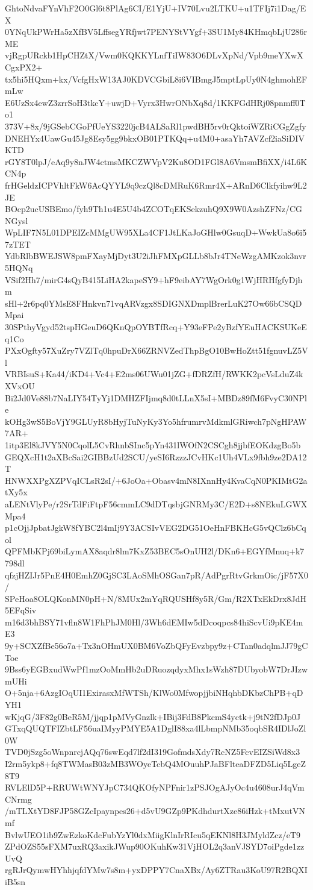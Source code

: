 GhtoNdvaFYnVhF2O0Gl6t8PlAg6CI/E1YjU+IV70Lvu2LTKU+u1TFIj7i1Dag/EX
0YNqUkPWrHa5zXfBV5LffsegYRfjwt7PENYStVYgf+3SU1My84KHmqbLjU286rME
vjRgpURckb1HpCHZtX/Vwm0KQKKYLnfTiIW83O6DLvXpNd/Vpb9meYXwXCgxPX2+
tx5hi5HQxm+kx/VcfgHxW13AJ0KDVCGbiL8i6VIBmgJ5mptLpUy0N4ghmohEFmLw
E6UzSx4ewZ3zrrSoH3tkcY+uwjD+Vyrx3HwrONbXq8d/1KKFGdHRj08pnmff0To1
373V+8x/9jGSebCGoPfUeYS3220jcB4ALSaRl1pwdBH5rv0rQktoiWZRiCGgZgfy
DNEHYx4UawGu45Jg8Esy5gg9bkxOB01PTKQq+u4M0+asaYh7AVZcf2iaSiDIVKTD
rGY8T0lpJ/eAq9y8nJW4ctmsMKCZWVpV2Ku8OD1FGl8A6VmsmBfiXX/i4L6KCN4p
frHGeldzICPVhltFkW6AcQYYL9q9czQl8cDMRuK6Rmr4X+ARnD6Clkfyihw9L2JE
BOcp2ucUSBEmo/fyh9Th1u4E5U4b4ZCOTqEKSekzuhQ9X9W0AzshZFNz/CGNGysl
WpLIF7N5L01DPEIZcMMgUW95XLa4CF1JtLKaJoGHlw0GsuqD+WwkUa8o6i57zTET
YdbRlbBWEJSW8pmFXayMjDyt3U2iJhFMXpGLLb8bJr4TNeWzgAMKzok3nvr5HQNq
VSif2Hh7/mirG4sQyB415LiHA2kapeSY9+hF9eibAY7WgOrk0g1WjHRHfgfyDjhm
sHl+2r6pq0YMsE8FHnkvn71vqARVzgx8SDIGNXDmplBrerLuK27Ow66bCSQDMpai
30SPthyVgyd52tspHGeuD6QKnQpOYBTfRcq+Y93eFPe2yBzfYEuHACKSUKeEq1Co
PXxOgfty57XuZry7VZlTq0hpuDrX66ZRNVZedThpBgO10BwHoZtt51fgnuvLZ5Vl
VRBIsuS+Ka44/iKD4+Vc4+E2ms06UWu01jZG+fDRZfH/RWKK2pcVsLduZ4kXVxOU
Bi2Jd0Ve88b7NaLIY54TyYj1DMHZFIjmq8d0tLLnX5sI+MBDz89fM6FvyC30NPle
kOHg3wS5BoVjY9GLUyR8bHyjTuNyKy3Yo5hfrumrvMdkmlGRiwch7pNgHPAW7AR+
1itp3El8kJVY5N0CqolL5CvRhnbSInc5pYn431lWOfN2CSCgh8jjbfEOKdzgBo5b
GEQXcH1t2aXBcSai2GIBBzUd2SCU/yeSI6RzzzJCvHKc1Uh4VLx9fbh9ze2DA12T
HNWXXPgXZPVqICLsR2sI/+6JoOa+Obasv4mN8IXnnHy4KvaCqN0PKIMtG2atXy5x
aLENtVlyPe/r2SrTdFiFtpF56cmmLC9dDTqsbjGNRMy3C/E2D+s8NEkuLGWXMpa4
p1cOjjJpbatJgkW8fYBC2l4mIj9Y3ACSIvVEG2DG51OeHnFBKHcG5vQClz6bCqol
QPFMbKPj69biLymAX8aqdr8lm7KxZ53BEC5sOnUH2l/DKn6+EGYfMnuq+k7798dl
qfzjHZIJr5PnE4H0EmhZ0GjSC3LAoSMhOSGan7pR/AdPgrRtvGrkmOic/jF57X0/
SPeHoa8OLQKonMN0pH+N/8MUx2mYqRQUSHf8y5R/Gm/R2XTxEkDrx8JdH5EFqSiv
m16d3bhBSY71vfln8W1FhPhJM0Hl/3Wh6dEMIw5dDcoqpcs84hiScvUi9pKE4mE3
9y+SCXZfBe56o7a+Tx3nOHmUX0BM6VoZbQFyEvzbpy9z+CTan0adqlmJJ79gCToe
9Bss6yEGBxudWwPf1mzOoMmHb2uDRuozqdyxMhx1sWzh87DUbyobW7DrJIzwmUHi
O+5nja+6AzgIOqUI1ExirasxMfWTSh/KlWo0MfwopjjbiNHqhbDKbzChPB+qDYH1
wKjqG/3F82g0BeR5M/jjqp1pMVyGnzlk+IBij3FdB8PkcmS4yctk+j9tN2fDJp0J
GTxqQUQTFIZbtLF56uaIMyyPMYE5A1DglI88xa4lLbmpNMb35oqbSR4IDlJoZl0W
TVD0jSzg5oWnpnrcjAQq76swEqd7lf2dI319GofmdsXdy7RcNZ5FcvEIZSiWd8x3
I2rm5ykp8+fq8TWMasB03zMB3WOyeTcbQ4MOuuhPJaBFlteaDFZD5Liq5LgeZ8T9
RVLElD5P+RRUWtWNYJpC734QKOfyNPFnir1zPSJOgAJyOc4u4608urJ4qVmCNrmg
/mTLXtYD8FJP58GZcIpaynpes26+d5vU9GZp9PKdhdurtXze86iHzk+tMxutVNmf
BvlwUEO1ib9ZwEzkoKdcFubYzYl0dxMiigKlnIrRIcu5qEKNl8H3JMyldZcz/eT9
ZPdOZS55sFXM7uxRQ3axikJWup90OKuhKw31VjHOL2q3anVJSYD7oiPgde1zzUvQ
rgRJrQymwHYhhjqfdYMw7s8m+yxDPPY7CnaXBx/Ay6ZTRau3KoU97R2BQXIiB5sn
